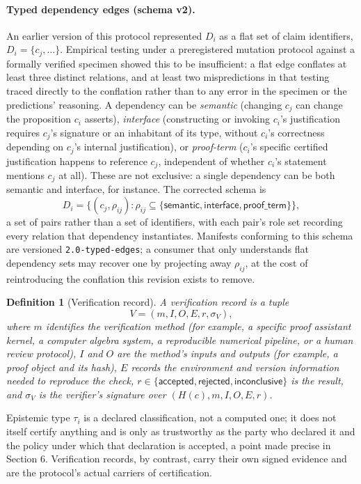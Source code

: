 \documentclass[11pt]{article}
\newtheorem{definition}{Definition}
\begin{document}
\paragraph{Typed dependency edges (schema v2).} An earlier version of this protocol represented $D_i$ as a flat set of claim identifiers, $D_i = \{c_j, \ldots\}$. Empirical testing under a preregistered mutation protocol against a formally verified specimen showed this to be insufficient: a flat edge conflates at least three distinct relations, and at least two mispredictions in that testing traced directly to the conflation rather than to any error in the specimen or the predictions' reasoning. A dependency can be \emph{semantic} (changing $c_j$ can change the proposition $c_i$ asserts), \emph{interface} (constructing or invoking $c_i$'s justification requires $c_j$'s signature or an inhabitant of its type, without $c_i$'s correctness depending on $c_j$'s internal justification), or \emph{proof-term} ($c_i$'s specific certified justification happens to reference $c_j$, independent of whether $c_i$'s statement mentions $c_j$ at all). These are not exclusive: a single dependency can be both semantic and interface, for instance. The corrected schema is
\[
D_i = \{ (c_j, \rho_{ij}) : \rho_{ij} \subseteq \{\mathsf{semantic}, \mathsf{interface}, \mathsf{proof\_term}\} \},
\]
a set of pairs rather than a set of identifiers, with each pair's role set recording every relation that dependency instantiates. Manifests conforming to this schema are versioned \texttt{2.0-typed-edges}; a consumer that only understands flat dependency sets may recover one by projecting away $\rho_{ij}$, at the cost of reintroducing the conflation this revision exists to remove.

\begin{definition}[Verification record]
A verification record is a tuple
\[
V = (m, I, O, E, r, \sigma_V),
\]
where $m$ identifies the verification method (for example, a specific proof assistant kernel, a computer algebra system, a reproducible numerical pipeline, or a human review protocol), $I$ and $O$ are the method's inputs and outputs (for example, a proof object and its hash), $E$ records the environment and version information needed to reproduce the check, $r \in \{\textsf{accepted}, \textsf{rejected}, \textsf{inconclusive}\}$ is the result, and $\sigma_V$ is the verifier's signature over $(H(c), m, I, O, E, r)$.
\end{definition}

Epistemic type $\tau_i$ is a declared classification, not a computed one; it does not itself certify anything and is only as trustworthy as the party who declared it and the policy under which that declaration is accepted, a point made precise in Section 6. Verification records, by contrast, carry their own signed evidence and are the protocol's actual carriers of certification.
\end{document}
